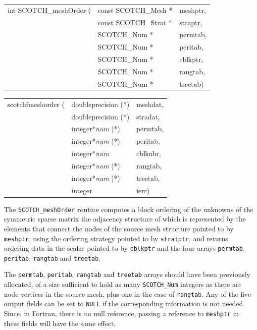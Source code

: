 \begin{itemize}
\progsyn

{\tt\begin{tabular}{l@{}ll}
int SCOTCH\_meshOrder ( & const SCOTCH\_Mesh *  & meshptr, \\
                        & const SCOTCH\_Strat * & straptr, \\
                        & SCOTCH\_Num *         & permtab, \\
                        & SCOTCH\_Num *         & peritab, \\
                        & SCOTCH\_Num *         & cblkptr, \\
                        & SCOTCH\_Num *         & rangtab, \\
                        & SCOTCH\_Num *         & treetab)
\end{tabular}}

{\tt\begin{tabular}{l@{}ll}
scotchfmeshorder ( & doubleprecision (*)   & meshdat, \\
                   & doubleprecision (*)   & stradat, \\
                   & integer*{\it num} (*) & permtab, \\
                   & integer*{\it num} (*) & peritab, \\
                   & integer*{\it num}     & cblknbr, \\
                   & integer*{\it num} (*) & rangtab, \\
                   & integer*{\it num} (*) & treetab, \\
                   & integer               & ierr)
\end{tabular}}

\progdes

The {\tt SCOTCH\_meshOrder} routine computes a block ordering of the
unknowns of the symmetric sparse matrix the adjacency structure of
which is represented by the elements that connect the nodes of the
source mesh structure pointed to by {\tt meshptr}, using the ordering
strategy pointed to by {\tt stratptr}, and returns ordering data in
the scalar pointed to by {\tt cblkptr} and the four arrays
{\tt permtab}, {\tt peritab}, {\tt rangtab} and {\tt treetab}.

The {\tt permtab}, {\tt peritab}, {\tt rangtab} and {\tt treetab}
arrays should have been previously allocated, of a size sufficient to
hold as many {\tt SCOTCH\_\lbt Num} integers as there are node
vertices in the source mesh, plus one in the case of {\tt rangtab}.
Any of the five output fields can be set to {\tt NULL} if the
corresponding information is not needed. Since, in Fortran, there is
no null reference, passing a reference to {\tt meshptr} in these
fields will have the same effect.


\end{itemize}
